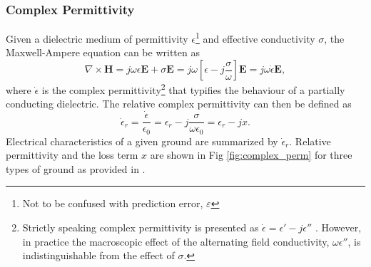 \documentclass[10pt,journal,twoside]{IEEEtran}
\begin{document}
\subsubsection{Complex Permittivity}
Given a dielectric medium of permittivity $\epsilon$\footnote{Not to be confused with prediction error, $\varepsilon$} and effective conductivity $\sigma$, the Maxwell-Ampere equation can be written as \cite{Jordan}
\begin{equation}
\nabla \times \mathbf{H} = j\omega\epsilon\mathbf{E} + \sigma \mathbf{E} = j\omega\left[ \epsilon - j\dfrac{\sigma}{\omega} \right]\mathbf{E} = j\omega\dot{\epsilon}\mathbf{E},
\end{equation}
where $\dot\epsilon$ is the complex permittivity\footnote{Strictly speaking complex permittivity is presented as $\dot{\epsilon} = \epsilon{'} - j\epsilon{''}$ \cite{Balanis:Electro}. However, in practice the macroscopic effect of the alternating field conductivity, $\omega\epsilon{''}$, is indistinguishable from the effect of $\sigma$.} that typifies the behaviour of a partially conducting dielectric. The relative complex permittivity can then be defined as
\begin{equation}
\dot\epsilon_{r} = \dfrac{\dot\epsilon}{\epsilon_0} = \epsilon_{r} - j\dfrac{\sigma}{\omega\epsilon_0} = \epsilon_{r} - jx. 
\end{equation}
Electrical characteristics of a given ground are summarized by $\dot\epsilon_{r}$. Relative permittivity and the loss term $x$ are shown in Fig \ref{fig:complex_perm} for three types of ground as provided in \cite{P527}.   
\end{document}
